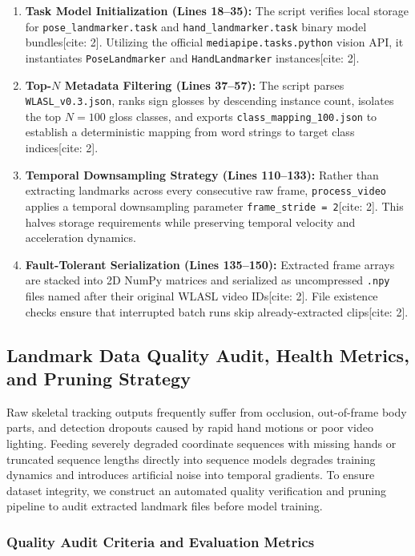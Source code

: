 \documentclass[12pt,a4paper]{article}
\begin{document}
\begin{enumerate}
    \item \textbf{Task Model Initialization (Lines 18--35):} The script verifies local storage for \texttt{pose\_landmarker.task} and \texttt{hand\_landmarker.task} binary model bundles[cite: 2]. Utilizing the official \texttt{mediapipe.tasks.python} vision API, it instantiates \texttt{PoseLandmarker} and \texttt{HandLandmarker} instances[cite: 2].
    \item \textbf{Top-$N$ Metadata Filtering (Lines 37--57):} The script parses \texttt{WLASL\_v0.3.json}, ranks sign glosses by descending instance count, isolates the top $N=100$ gloss classes, and exports \texttt{class\_mapping\_100.json} to establish a deterministic mapping from word strings to target class indices[cite: 2].
    \item \textbf{Temporal Downsampling Strategy (Lines 110--133):} Rather than extracting landmarks across every consecutive raw frame, \texttt{process_video} applies a temporal downsampling parameter \texttt{frame\_stride = 2}[cite: 2]. This halves storage requirements while preserving temporal velocity and acceleration dynamics.
    \item \textbf{Fault-Tolerant Serialization (Lines 135--150):} Extracted frame arrays are stacked into 2D NumPy matrices and serialized as uncompressed \texttt{.npy} files named after their original WLASL video IDs[cite: 2]. File existence checks ensure that interrupted batch runs skip already-extracted clips[cite: 2].
\end{enumerate}




\subsection{Landmark Data Quality Audit, Health Metrics, and Pruning Strategy}

Raw skeletal tracking outputs frequently suffer from occlusion, out-of-frame body parts, and detection dropouts caused by rapid hand motions or poor video lighting. Feeding severely degraded coordinate sequences with missing hands or truncated sequence lengths directly into sequence models degrades training dynamics and introduces artificial noise into temporal gradients. To ensure dataset integrity, we construct an automated quality verification and pruning pipeline to audit extracted landmark files before model training.

\subsubsection{Quality Audit Criteria and Evaluation Metrics}
\end{document}
